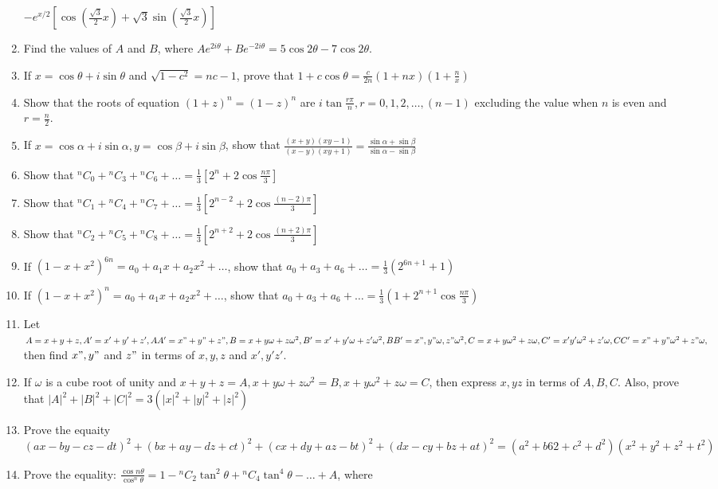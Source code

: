\begin{enumerate}[resume]
  $-e^{x/2}\left[\cos\left(\frac{\sqrt{3}}{2}x\right) + \sqrt{3}\sin\left(\frac{\sqrt{3}}{2}x\right)\right]$
\item Find the values of $A$ and $B$, where $Ae^{2i\theta} + Be^{-2i\theta} = 5\cos2\theta - 7\cos2\theta$.
\item If $x = \cos\theta + i\sin\theta$ and $\sqrt{1 - c^2} = nc - 1$, prove that $1 + c\cos\theta = \frac{c}{2n}(1 + nx)(1 +
  \frac{n}{x})$
\item Show that the roots of equation $(1 + z)^n = (1 - z)^n$ are $i\tan\frac{r\pi}{n}, r = 0, 1, 2, \ldots, (n - 1)$ excluding the
  value when $n$ is even and $r = \frac{n}{2}$.
\item If $x = \cos\alpha + i\sin\alpha, y = \cos\beta + i\sin\beta$, show that $\frac{(x + y)(xy - 1)}{(x - y)(xy + 1)} =
  \frac{\sin\alpha + \sin\beta}{\sin\alpha - \sin\beta}$
\item Show that ${}^nC_0 + {}^nC_3 + {}^nC_6 + \ldots = \frac{1}{3}\left[2^n + 2\cos\frac{n\pi}{3}\right]$
\item Show that ${}^nC_1 + {}^nC_4 + {}^nC_7 + \ldots = \frac{1}{3}\left[2^{n - 2} + 2\cos\frac{(n - 2)\pi}{3}\right]$
\item Show that ${}^nC_2 + {}^nC_5 + {}^nC_8 + \ldots = \frac{1}{3}\left[2^{n + 2} + 2\cos\frac{(n + 2)\pi}{3}\right]$
\item If $(1 - x + x^2)^{6n} = a_0 + a_1x + a_2x^2 + \ldots$, show that $a_0 + a_3 + a_6 + \ldots = \frac{1}{3}(2^{6n + 1} + 1)$
\item If $(1 - x + x^2)^n = a_0 + a_1x + a_2x^2 + \ldots$, show that $a_0 + a_3 + a_6 + \ldots = \frac{1}{3}\left(1 + 2^{n +
  1}\cos\frac{n\pi}{3}\right)$
\item Let $A = x + y + z, A' = x' + y' + z', AA' = x" + y" + z", B = x + y\omega + z\omega^2, B' = x' + y'\omega + z'\omega^2, BB'
  = x", y"\omega, z"\omega^2, C = x + y\omega^2 + z\omega, C' = x' y'\omega^2 + z'\omega, CC' = x" + y"\omega^2 + z"\omega,$ then
  find $x", y"$ and $z"$ in terms of $x, y, z$ and $x', y' z'$.
\item If $\omega$ is a cube root of unity and $x + y + z = A, x + y\omega + z\omega^2 = B, x + y\omega^2 + z\omega = C$, then
  express $x, y z$ in terms of $A, B, C$. Also, prove that $|A|^2 + |B|^2 + |C|^2 = 3(|x|^2 + |y|^2 + |z|^2)$
\item Prove the equaity $(ax - by - cz - dt)^2 + (bx + ay - dz + ct)^2 + (cx + dy + az - bt)^2 + (dx - cy + bz + at)^2 = (a^2 + b62
  + c^2 + d^2)(x^2 + y^2 + z^2 + t^2)$
\item Prove the equality: $\frac{\cos n\theta}{\cos^n\theta} = 1 - {}^nC_2\tan^2\theta + {}^nC_4\tan^4\theta - \ldots + A$, where

\end{enumerate}
